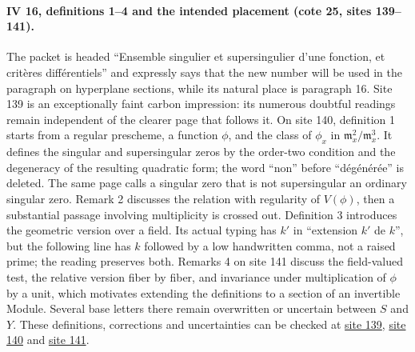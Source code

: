 \paragraph{IV 16, definitions 1--4 and the intended placement (cote 25, sites 139--141).}
The packet is headed ``Ensemble singulier et supersingulier d'une fonction, et critères différentiels'' and expressly says that the new number will be used in the paragraph on hyperplane sections, while its natural place is paragraph 16. Site 139 is an exceptionally faint carbon impression: its numerous doubtful readings remain independent of the clearer page that follows it. On site 140, definition 1 starts from a regular prescheme, a function $\phi$, and the class of $\phi_x$ in $\mathfrak m_x^2/\mathfrak m_x^3$. It defines the singular and supersingular zeros by the order-two condition and the degeneracy of the resulting quadratic form; the word ``non'' before ``dégénérée'' is deleted. The same page calls a singular zero that is not supersingular an ordinary singular zero. Remark 2 discusses the relation with regularity of $V(\phi)$, then a substantial passage involving multiplicity is crossed out. Definition 3 introduces the geometric version over a field. Its actual typing has $k'$ in ``extension $k'$ de $k$'', but the following line has $k$ followed by a low handwritten comma, not a raised prime; the reading preserves both. Remarks 4 on site 141 discuss the field-valued test, the relative version fiber by fiber, and invariance under multiplication of $\phi$ by a unit, which motivates extending the definitions to a section of an invertible Module. Several base letters there remain overwritten or uncertain between $S$ and $Y$. These definitions, corrections and uncertainties can be checked at \href{https://grothendieck.umontpellier.fr/web/viewer.html?file=../25.pdf#page=140}{site 139}, \href{https://grothendieck.umontpellier.fr/web/viewer.html?file=../25.pdf#page=141}{site 140} and \href{https://grothendieck.umontpellier.fr/web/viewer.html?file=../25.pdf#page=142}{site 141}.


